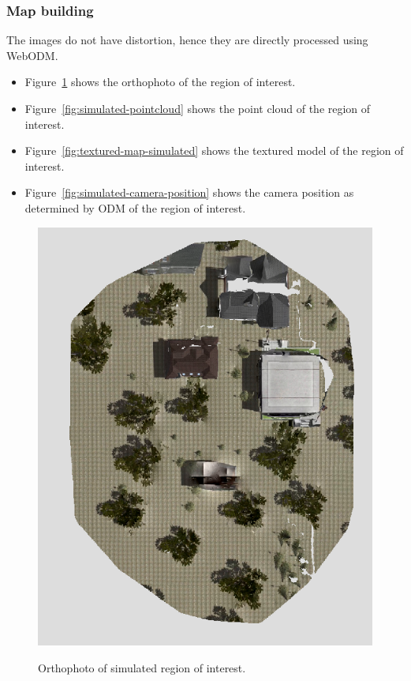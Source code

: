 \subsubsection{Map building}
The images do not have distortion, hence they are directly processed using WebODM.
\begin{itemize}
	\item Figure~\ref{fig:orthophoto-simulated} shows the orthophoto of the region of interest.
	\item Figure~\ref{fig:simulated-pointcloud} shows the point cloud of the region of interest.
	\item Figure~\ref{fig:textured-map-simulated} shows the textured model of the region of interest.
	\item Figure~\ref{fig:simulated-camera-position} shows the camera position as determined by ODM of the region of interest.
\end{itemize}

\begin{figure}
	\centering
	\caption[Orthophoto of simulated region of interest.]{\small Orthophoto of simulated region of interest.} 
	\includegraphics[width=5in]{figures/experiment/orthophoto-simulated}
	\label{fig:orthophoto-simulated}
\end{figure}

